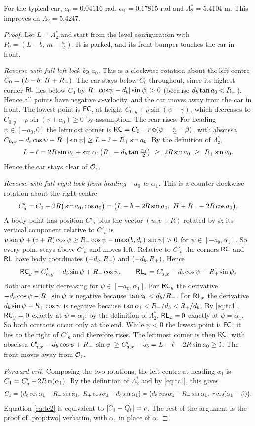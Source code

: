 For the typical car, $a_0=0.04116$ rad, $\alpha_1=0.17815$ rad and $\Lambda_2^*=5.4104$ m.
This improves on $\Lambda_2=5.4247$.

\begin{proof}
Let $L=\Lambda_2^*$ and start from the level configuration with $P_0=(L-b,\,m+\tfrac w2)$.
It is parked, and its front bumper touches the car in front.

\emph{Reverse with full left lock by $a_0$.}
This is a clockwise rotation about the left centre $C_0=(L-b,\,H+R_{-})$.
The car stays below $C_0$ throughout, since its highest corner $\mathsf{RL}$ lies below $C_0$ by $\Rm\cos\psi-d_b|\sin\psi|>0$ (because $d_b\tan a_0<R_{-}$).
Hence all points have negative $x$-velocity, and the car moves away from the car in front.
The lowest point is $\mathsf{FC}$, at height $C_{0,y}+\rho\sin(\psi-\gamma)$, which decreases to $C_{0,y}-\rho\sin(\gamma+a_0)\ge0$ by assumption.
The rear rises.
For heading $\psi\in[-a_0,0]$ the leftmost corner is $\mathsf{RC}=C_0+r\,\mathbf{e}(\psi-\frac\pi2-\beta)$, with abscissa $C_{0,x}-d_b\cos\psi-R_{+}|\sin\psi|\ge L-\ell-R_{+}\sin a_0$.
By the definition of $\Lambda_2^*$,
\[
  L-\ell=2R\sin a_0+\sin\alpha_1\big(\Rp-d_b\tan\tfrac{\alpha_1}2\big)\ \ge\ 2R\sin a_0\ \ge\ \Rp\sin a_0 .
\]
Hence the car stays clear of $\mathcal{O}_{\mathrm r}$.

\emph{Reverse with full right lock from heading $-a_0$ to $\alpha_1$.}
This is a counter-clockwise rotation about the right centre
\[
  C'_a=C_0-2R\big(\sin a_0,\cos a_0\big)=\big(L-b-2R\sin a_0,\ H+R_{-}-2R\cos a_0\big).
\]
A body point has position $C'_a$ plus the vector $(u,v+R)$ rotated by $\psi$; its vertical component relative to $C'_a$ is $u\sin\psi+(v+R)\cos\psi\ge\Rm\cos\psi-\max(b,d_b)|\sin\psi|>0$ for $\psi\in[-a_0,\alpha_1]$.
So every point stays above $C'_a$ and moves left.
Relative to $C'_a$ the corners $\mathsf{RC}$ and $\mathsf{RL}$ have body coordinates $(-d_b,R_{-})$ and $(-d_b,R_{+})$.
Hence
\[
  \mathsf{RC}_y=C'_{a,y}-d_b\sin\psi+R_{-}\cos\psi,\qquad \mathsf{RL}_x=C'_{a,x}-d_b\cos\psi-R_{+}\sin\psi .
\]
Both are strictly decreasing for $\psi\in[-a_0,\alpha_1]$.
For $\mathsf{RC}_y$ the derivative $-d_b\cos\psi-R_{-}\sin\psi$ is negative because $\tan a_0<d_b/R_{-}$.
For $\mathsf{RL}_x$ the derivative $d_b\sin\psi-R_{+}\cos\psi$ is negative because $\tan\alpha_1<R_{-}/d_b<R_{+}/d_b$.
By \eqref{eq:tc1}, $\mathsf{RC}_y=0$ exactly at $\psi=\alpha_1$; by the definition of $\Lambda_2^*$, $\mathsf{RL}_x=0$ exactly at $\psi=\alpha_1$.
So both contacts occur only at the end.
While $\psi<0$ the lowest point is $\mathsf{FC}$; it lies to the right of $C'_a$ and therefore rises.
The leftmost corner is then $\mathsf{RC}$, with abscissa $C'_{a,x}-d_b\cos\psi+R_{-}|\sin\psi|\ge C'_{a,x}-d_b=L-\ell-2R\sin a_0\ge0$.
The front moves away from $\mathcal{O}_{\mathrm f}$.

\emph{Forward exit.}
Composing the two rotations, the left centre at heading $\alpha_1$ is $C_1=C'_a+2R\,\mathbf{n}(\alpha_1)$.
By the definition of $\Lambda_2^*$ and by \eqref{eq:tc1}, this gives
\[
  C_1=\big(d_b\cos\alpha_1-\Rm\sin\alpha_1,\ \Rp\cos\alpha_1+d_b\sin\alpha_1\big)=\big(d_b\cos\alpha_1-\Rm\sin\alpha_1,\ r\cos(\alpha_1-\beta)\big).
\]
Equation \eqref{eq:tc2} is equivalent to $|C_1-Q_{\mathrm f}|=\rho$.
The rest of the argument is the proof of \cref{prop:two} verbatim, with $\alpha_1$ in place of $\alpha$.
\end{proof}

